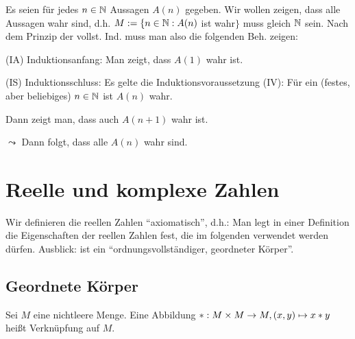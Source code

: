 \documentclass[12pt]{scrreprt}
\begin{document}
Es seien für jedes $n\in\mathbb{N}$ Aussagen $A(n)$ gegeben. Wir wollen zeigen, dass alle Aussagen wahr sind, d.h. $M := \{n\in\mathbb{N}: A(n)$ ist wahr$\}$ muss gleich $\mathbb{N}$ sein. Nach dem Prinzip der vollst. Ind. muss man also die folgenden Beh. zeigen:

(IA) Induktionsanfang: Man zeigt, dass $A(1)$ wahr ist.

(IS) Induktionsschluss: Es gelte die Induktionsvoraussetzung (IV): Für ein (festes, aber beliebiges) $n\in\mathbb{N}$ ist $A(n)$ wahr.

Dann zeigt man, dass auch $A(n+1)$ wahr ist.

$\leadsto$ Dann folgt, dass alle $A(n)$ wahr sind.

\chapter{Reelle und komplexe Zahlen}
\label{cha:zahlen}
Wir definieren die reellen Zahlen "`axiomatisch"', d.h.: Man legt in einer Definition die 
Eigenschaften der reellen Zahlen fest, die im folgenden verwendet werden dürfen.
Ausblick:  ist ein "`ordnungsvollständiger, geordneter Körper"'.

\section{Geordnete Körper}
\label{sec:zahlen.geordnete-koerper}
\begin{dfn*}
Sei $M$ eine nichtleere Menge. Eine Abbildung $\ast: M\times M \rightarrow M, (x, y) 
\mapsto x \ast y$ heißt Verknüpfung auf $M$.
\end{dfn*}
\end{document}
